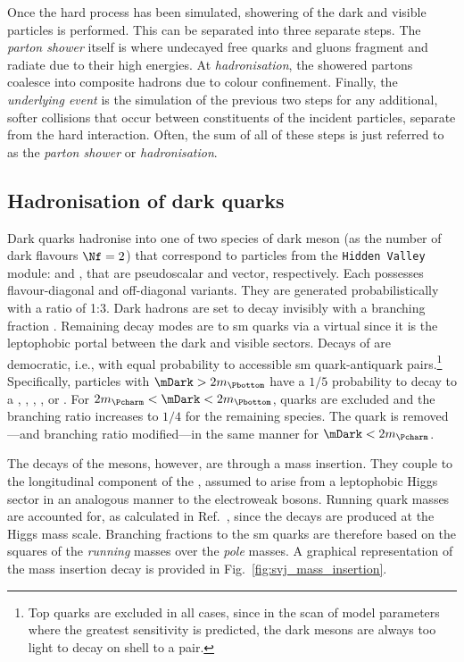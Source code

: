 Once the hard process has been simulated, showering of the dark and visible particles is performed. This can be separated into three separate steps. The \emph{parton shower} itself is where undecayed free quarks and gluons fragment and radiate due to their high energies. At \emph{hadronisation}, the showered partons coalesce into composite hadrons due to colour confinement. Finally, the \emph{underlying event} is the simulation of the previous two steps for any additional, softer collisions that occur between constituents of the incident particles, separate from the hard interaction. Often, the sum of all of these steps is just referred to as the \emph{parton shower} or \emph{hadronisation}.




\subsection{Hadronisation of dark quarks}
\label{subsec:svj_dark_hadronisation}

Dark quarks hadronise into one of two species of dark meson (as the number of dark flavours $\Nf = \text{2}$) that correspond to particles from the \texttt{Hidden Valley} module: \Ppidark and \Prhodark, that are pseudoscalar and vector, respectively. Each possesses flavour-diagonal and off-diagonal variants. They are generated probabilistically with a ratio of 1:3. Dark hadrons are set to decay invisibly with a branching fraction \rinv. Remaining decay modes are to \acrshort{sm} quarks via a virtual \PZprime since it is the leptophobic portal between the dark and visible sectors. Decays of \Prhodark are democratic, i.e., with equal probability to accessible \acrshort{sm} quark-antiquark pairs.\footnote{Top quarks are excluded in all cases, since in the scan of model parameters where the greatest sensitivity is predicted, the dark mesons are always too light to decay on shell to a \ttbar pair.} Specifically, \Prhodark particles with $\mDark > \text{2}m_{\Pbottom}$ have a $\text{1}/\text{5}$ probability to decay to a \Pup, \Pdown, \Pcharm, \Pstrange, or \Pbottom. For $\text{2}m_{\Pcharm} < \mDark < \text{2}m_{\Pbottom}$, \Pbottom quarks are excluded and the branching ratio increases to $\text{1}/\text{4}$ for the remaining species. The \Pcharm quark is removed---and branching ratio modified---in the same manner for $\mDark < \text{2}m_{\Pcharm}$.

The decays of the \Ppidark mesons, however, are through a mass insertion. They couple to the longitudinal component of the \PZprime, assumed to arise from a leptophobic Higgs sector in an analogous manner to the electroweak bosons. Running quark masses are accounted for, as calculated in Ref.~, since the decays are produced at the Higgs mass scale. Branching fractions to the \acrshort{sm} quarks are therefore based on the squares of the \emph{running} masses over the \emph{pole} masses. A graphical representation of the mass insertion decay is provided in Fig.~\ref{fig:svj_mass_insertion}.

